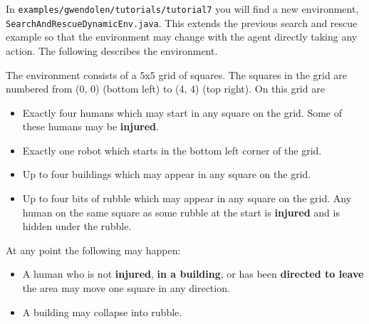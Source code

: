 \documentclass[a4]{article}
\begin{document}
In \texttt{examples/gwendolen/tutorials/tutorial7} you will find a new environment, \texttt{SearchAndRescueDynamicEnv.java}.  This extends the previous search and rescue example so that the environment may change with the agent directly taking any action.  The following describes the environment.

The environment consists of a 5x5 grid of squares.  The squares in the grid are numbered from (0, 0) (bottom left) to (4, 4) (top right).  On this grid are
\begin{itemize}
\item Exactly four humans which may start in any square on the grid.  Some of these humans may be {\bf injured}.
\item Exactly one robot which starts in the bottom left corner of the grid.
\item Up to four buildings which may appear in any square on the grid.
\item Up to four bits of rubble which may appear in any square on the grid.  Any human on the same square as some rubble at the start is {\bf injured} and is hidden under the rubble.
\end{itemize}

At any point the following may happen:
\begin{itemize}
\item A human who is not {\bf injured}, {\bf in a building}, or has been {\bf directed to leave} the area may move one square in any direction.
\item A building may collapse into rubble.
\end{itemize}
\end{document}
